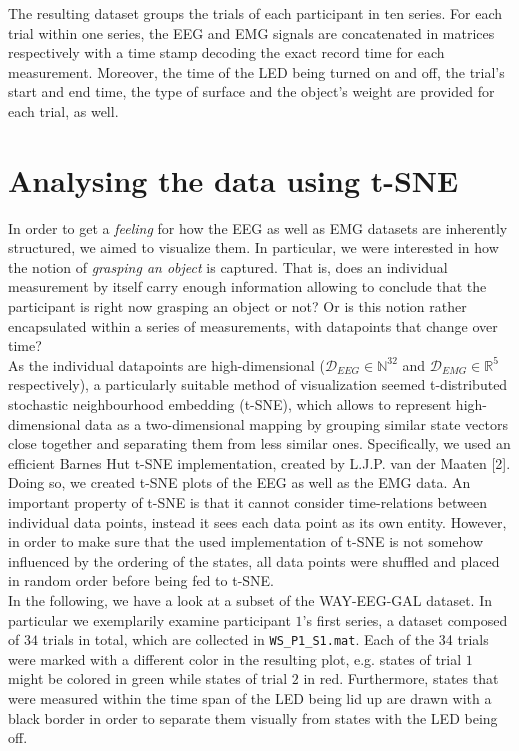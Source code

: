\documentclass{article} %
\begin{document}
The resulting dataset groups the trials of each participant in ten series. For each trial within one series, the EEG and EMG signals are concatenated in matrices respectively with a time stamp decoding the exact record time for each measurement. Moreover, the time of the LED being turned on and off, the trial's start and end time, the type of surface and the object's weight are provided for each trial, as well. \cite{nature}




\section{Analysing the data using t-SNE}
In order to get a \emph{feeling} for how the EEG as well as EMG datasets are inherently structured, we aimed to visualize them. In particular, we were interested in how the notion of \emph{grasping an object} is captured. That is, does an individual measurement by itself carry enough information allowing to conclude that the participant is right now grasping an object or not? Or is this notion rather encapsulated within a series of measurements, with datapoints that change over time?\\
As the individual datapoints are high-dimensional ($\mathcal{D}_{EEG} \in \mathbb{N}^{32}$ and $\mathcal{D}_{EMG} \in \mathbb{R}^5$ respectively), a particularly suitable method of visualization seemed t-distributed stochastic neighbourhood embedding (t-SNE), which allows to represent high-dimensional data as a two-dimensional mapping by grouping similar state vectors close together and separating them from less similar ones. Specifically, we used an efficient Barnes Hut t-SNE implementation, created by L.J.P. van der Maaten [2]. Doing so, we created t-SNE plots of the EEG as well as the EMG data. An important property of t-SNE is that it cannot consider time-relations between individual data points, instead it sees each data point as its own entity. However, in order to make sure that the used implementation of t-SNE is not somehow influenced by the ordering of the states, all data points were shuffled and placed in random order before being fed to t-SNE.\\
In the following, we have a look at a subset of the WAY-EEG-GAL dataset. In particular we exemplarily examine participant $1$'s first series, a dataset composed of $34$ trials in total, which are collected in \verb|WS_P1_S1.mat|. Each of the 34 trials were marked with a different color in the resulting plot, e.g. states of trial $1$ might be colored in green while states of trial $2$ in red. Furthermore, states that were measured within the time span of the LED being lid up are drawn with a black border in order to separate them visually from states with the LED being off.\\
\end{document}
